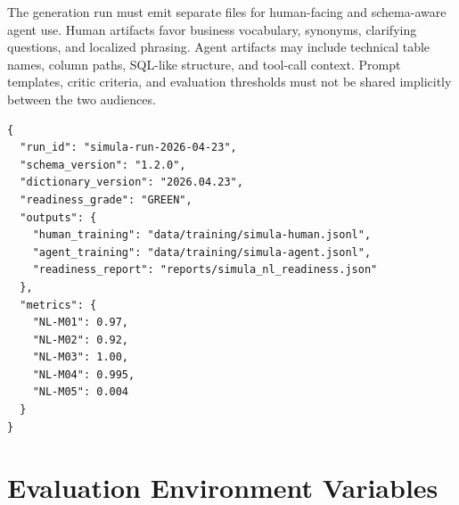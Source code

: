 The generation run must emit separate files for human-facing and schema-aware
agent use. Human artifacts favor business vocabulary, synonyms, clarifying
questions, and localized phrasing. Agent artifacts may include technical table
names, column paths, SQL-like structure, and tool-call context. Prompt templates,
critic criteria, and evaluation thresholds must not be shared implicitly between
the two audiences.

\begin{lstlisting}[language=jsonx,caption={Readiness assessment artifact split}]
{
  "run_id": "simula-run-2026-04-23",
  "schema_version": "1.2.0",
  "dictionary_version": "2026.04.23",
  "readiness_grade": "GREEN",
  "outputs": {
    "human_training": "data/training/simula-human.jsonl",
    "agent_training": "data/training/simula-agent.jsonl",
    "readiness_report": "reports/simula_nl_readiness.json"
  },
  "metrics": {
    "NL-M01": 0.97,
    "NL-M02": 0.92,
    "NL-M03": 1.00,
    "NL-M04": 0.995,
    "NL-M05": 0.004
  }
}
\end{lstlisting}

\section{Evaluation Environment Variables}

